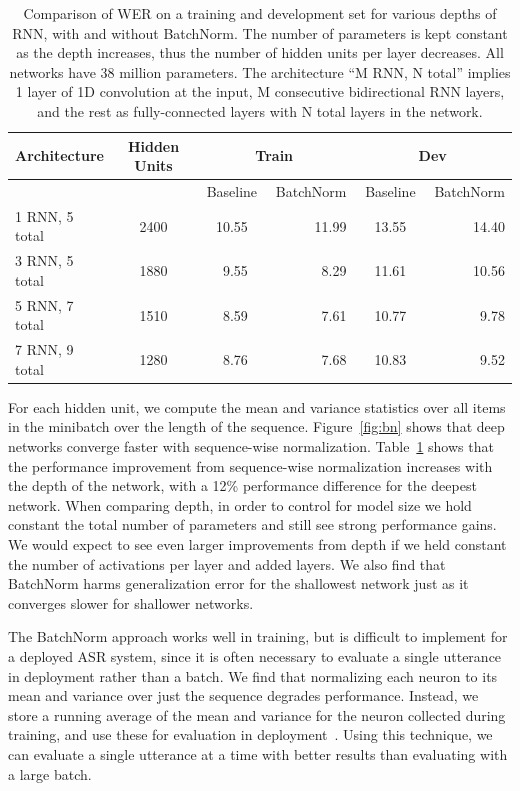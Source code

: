\documentclass{article}
\begin{document}
\begin{table}
\centering
\begin{tabular}{l  c  r r r  r  r r r  r}
\toprule
Architecture & Hidden Units & \multicolumn{4}{c}{Train} & \multicolumn{4}{c}{Dev}  \\
\midrule
     &  & \multicolumn{3}{c}{Baseline} & BatchNorm & \multicolumn{3}{c}{Baseline} & BatchNorm \\
\midrule
1 RNN, 5 total   & 2400 & & 10.55 & & 11.99 & & 13.55 & & 14.40 \\
3 RNN, 5 total   & 1880 & & 9.55  & & 8.29  & & 11.61 & & 10.56 \\
5 RNN, 7 total   & 1510 & & 8.59  & & 7.61  & & 10.77 & & 9.78 \\
7 RNN, 9 total   & 1280 & & 8.76  & & 7.68  & & 10.83 & & 9.52 \\
\bottomrule
\end{tabular}
\caption{Comparison of WER on a training and development set for various depths of RNN, with and without BatchNorm. The number of parameters is kept constant as the depth increases, thus the number of hidden units per layer decreases. All networks have 38 million parameters. The architecture ``M RNN, N total'' implies 1 layer of 1D convolution at the input, M consecutive bidirectional RNN layers, and the rest as fully-connected layers with N total layers in the network.}
\label{table:batch_norm}
\end{table}

For each hidden unit, we compute the mean and variance statistics over all items in the minibatch over the length of the sequence. Figure~\ref{fig:bn} shows that deep networks converge faster with sequence-wise normalization. Table~\ref{table:batch_norm} shows that the performance improvement from sequence-wise normalization increases with the depth of the network, with a 12\% performance difference for the deepest network. When comparing depth, in order to control for model size we hold constant the total number of parameters and still see strong performance gains. We would expect to see even larger improvements from depth if we held constant the number of activations per layer and added layers. We also find that BatchNorm harms generalization error for the shallowest network just as it converges slower for shallower networks. 

The BatchNorm approach works well in training, but is difficult to implement for a deployed ASR system, since it is often necessary to evaluate a single utterance in deployment rather than a batch. We find that normalizing each neuron to its mean and variance over just the sequence degrades performance. Instead, we store a running average of the mean and variance for the neuron collected during training, and use these for evaluation in deployment~\cite{ioffe2015}. Using this technique, we can evaluate a single utterance at a time with better results than evaluating with a large batch.
\end{document}
